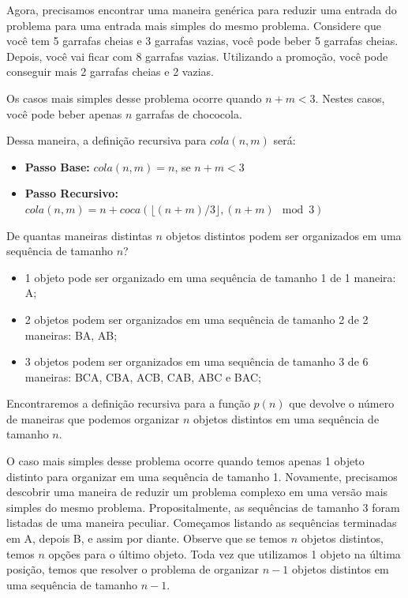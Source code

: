 Agora, precisamos encontrar uma maneira genérica para reduzir uma entrada do problema para uma entrada mais simples do mesmo problema. Considere que você tem 5 garrafas cheias  e 3 garrafas vazias, você pode beber 5 garrafas cheias. Depois, você vai ficar com 8 garrafas vazias. Utilizando a promoção, você pode conseguir mais 2 garrafas cheias e 2 vazias. 

Os casos mais simples desse problema ocorre quando $n+m < 3$. Nestes casos, você pode beber apenas $n$ garrafas de chococola.


Dessa maneira, a definição recursiva para $cola(n,m)$ será:

\begin{itemize}
    \item \textbf{Passo Base:} $cola(n,m) = n$, se $n+m < 3$
    \item \textbf{Passo Recursivo:} $cola(n,m) = n + coca( \lfloor (n+m)/3 \rfloor , (n+m) \mod 3)$
\end{itemize}

\begin{exemplo}
De quantas maneiras distintas $n$ objetos distintos podem ser organizados em uma sequência de tamanho $n$?


\begin{itemize}
    \item 1 objeto pode ser organizado em uma sequência de tamanho 1 de 1 maneira: A;
    \item 2 objetos podem ser organizados em uma sequência de tamanho 2 de 2 maneiras: BA, AB;
    \item 3 objetos podem ser organizados em uma sequência de tamanho 3 de 6 maneiras: BCA, CBA, ACB, CAB, ABC e BAC;
\end{itemize}

\end{exemplo}

Encontraremos a definição recursiva para a função $p(n)$ que devolve o número de maneiras que podemos organizar $n$ objetos distintos em uma sequência de tamanho $n$.

O caso mais simples desse problema ocorre quando temos apenas 1 objeto distinto para organizar em uma sequência de tamanho 1. Novamente, precisamos descobrir uma maneira de reduzir um problema complexo em uma versão mais simples do mesmo problema. Propositalmente, as sequências de tamanho 3 foram listadas de uma maneira peculiar. Começamos listando as sequências terminadas em A, depois B, e assim por diante. Observe que se temos $n$ objetos distintos, temos $n$ opções para o último objeto. Toda vez que utilizamos 1 objeto na última posição, temos que resolver o problema de organizar $n-1$ objetos distintos em uma sequência de tamanho $n-1$.



